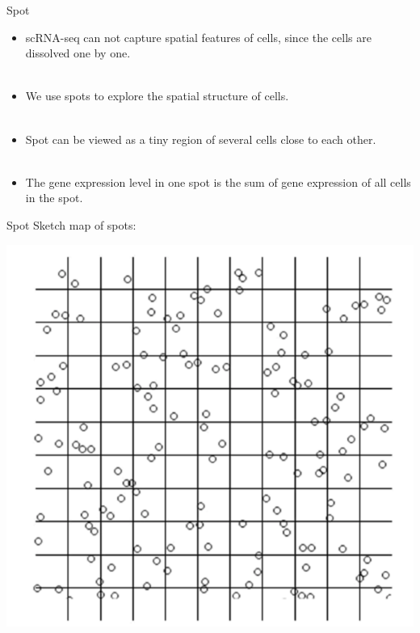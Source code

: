 \documentclass[10 pt]{beamer}
\begin{document}
\begin{frame}{Spot}
\begin{itemize}
	\item scRNA-seq can not capture spatial features of cells, since the cells are dissolved one by one.
	~\\
	~\\
	\item We use spots to explore the spatial structure of cells.
	~\\
	~\\
	\item Spot can be viewed as a tiny region of several cells close to each other.
	~\\
	~\\
	\item  The gene expression level in one spot is the sum of gene expression of all cells in the spot.
\end{itemize}
\end{frame}


\begin{frame}{Spot}
Sketch map of spots:

\centerline{\includegraphics[scale=0.4]{pic/spot.png}}

\end{frame}
\end{document}
